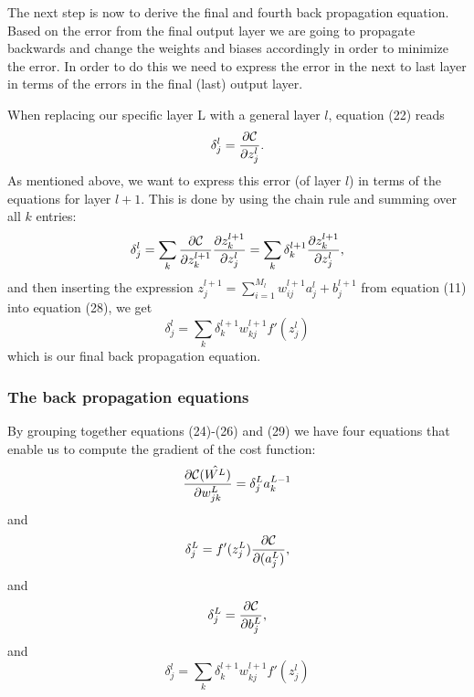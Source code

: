 \documentclass[a4paper,12pt]{article}
\begin{document}
The next step is now to derive the final and fourth back propagation equation. Based on the error from the final output layer we are going to propagate backwards and change the weights and biases accordingly in order to minimize the error. In order to do this we need to express the error in the next to last layer in terms of the errors in the final (last) output layer.\newline

When replacing our specific layer L with a general layer $l$, equation (22) reads
\begin{equation}
    \delta_j^l =\frac{\partial {\cal C}}{\partial z_j^l}.
\end{equation}
As mentioned above, we want to express this error (of layer $l$) in terms of the equations for layer $l+1$. This is done by using the chain rule and summing over all $k$ entries:
\begin{equation}
    \delta_j^l =\sum_k \frac{\partial {\cal C}}{\partial z_k^{l+1}}\frac{\partial z_k^{l+1}}{\partial z_j^{l}}=\sum_k \delta_k^{l+1}\frac{\partial z_k^{l+1}}{\partial z_j^{l}},
\end{equation}
and then inserting the expression $z_j^{l+1} = \sum_{i=1}^{M_{l}}w_{ij}^{l+1}a_j^{l}+b_j^{l+1}$ from equation (11) into equation (28), we get
\begin{equation}
    \delta_j^l =\sum_k \delta_k^{l+1}w_{kj}^{l+1}f'(z_j^l)
\end{equation}
which is our final back propagation equation.

\subsubsection{The back propagation equations}
By grouping together equations (24)-(26) and (29) we have four equations that enable us to compute the gradient of the cost function:
\begin{equation}
    \frac{\partial{\cal C}(\hat{W^L})}{\partial w_{jk}^L}  =  \delta_j^La_k^{L-1}
\end{equation}
and
\begin{equation}
\delta_j^L = f'(z_j^L)\frac{\partial {\cal C}}{\partial (a_j^L)},
\end{equation}
and
\begin{equation}
\delta_j^L = \frac{\partial {\cal C}}{\partial b_j^L},
\end{equation}
and
\begin{equation}
    \delta_j^l =\sum_k \delta_k^{l+1}w_{kj}^{l+1}f'(z_j^l)
\end{equation}
\end{document}
